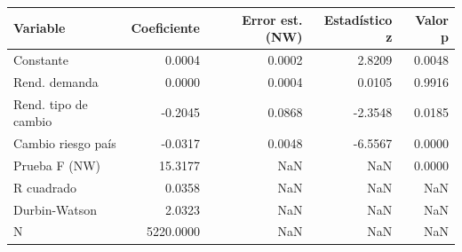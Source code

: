 \begin{tabular}{lrrrr}
\toprule
Variable & Coeficiente & Error est. (NW) & Estadístico z & Valor p \\
\midrule
Constante & 0.0004 & 0.0002 & 2.8209 & 0.0048 \\
Rend. demanda & 0.0000 & 0.0004 & 0.0105 & 0.9916 \\
Rend. tipo de cambio & -0.2045 & 0.0868 & -2.3548 & 0.0185 \\
Cambio riesgo país & -0.0317 & 0.0048 & -6.5567 & 0.0000 \\
Prueba F (NW) & 15.3177 & NaN & NaN & 0.0000 \\
R cuadrado & 0.0358 & NaN & NaN & NaN \\
Durbin-Watson & 2.0323 & NaN & NaN & NaN \\
N & 5220.0000 & NaN & NaN & NaN \\
\bottomrule
\end{tabular}
